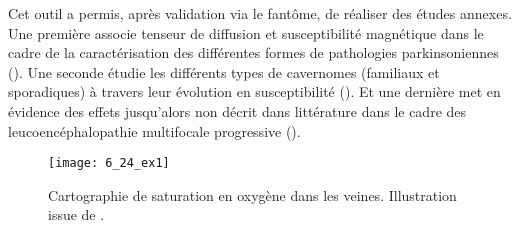 {Cet outil a permis, après validation via le fantôme, de réaliser des études annexes. Une
première associe tenseur de diffusion et susceptibilité magnétique dans le cadre de la caractérisation
des différentes formes de pathologies parkinsoniennes (\cite{Dunet2015}). Une seconde étudie les différents types
de cavernomes (familiaux et sporadiques) à travers leur évolution en susceptibilité (\cite{Balasse2015}). Et une
dernière met en évidence des effets jusqu’alors non décrit dans littérature dans le cadre des
leucoencéphalopathie multifocale progressive (\cite{Carra2015}).

\begin{figure}[!t]
\centering
\texttt{[image: 6\_24\_ex1]}
\caption{Cartographie de saturation en oxygène dans les veines. Illustration issue de \cite{Fan2014}.}
\label{fig:6_24_ex1}	
\end{figure}
}
